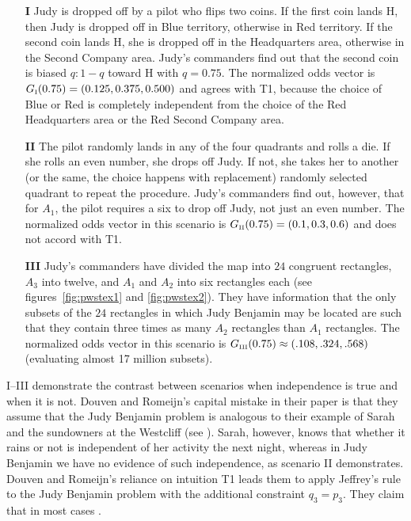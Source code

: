 \documentclass[12pt]{article}
\begin{document}
\begin{enumerate}
\item[\textbf{I}] Judy is dropped off by a pilot who flips two
  coins. If the first coin lands H, then Judy is dropped off in Blue
  territory, otherwise in Red territory. If the second coin lands H,
  she is dropped off in the Headquarters area, otherwise in the
  Second Company area. Judy's commanders find out that the second coin
  is biased $q:1-q$ toward H with $q=0.75$. The normalized odds
  vector is $G_{\mbox{\tiny I}}(0.75)=(0.125,0.375,0.500)$ and agrees
  with T1, because the choice of Blue or Red is completely independent
  from the choice of the Red Headquarters area or the Red Second
  Company area.
\item[\textbf{II}] The pilot randomly lands in any of the four
  quadrants and rolls a die. If she rolls an even number, she drops
  off Judy. If not, she takes her to another (or the same, the choice
  happens with replacement) randomly selected quadrant to repeat the
  procedure. Judy's commanders find out, however, that for $A_{1}$,
  the pilot requires a six to drop off Judy, not just an even number.
  The normalized odds vector in this scenario is $G_{\mbox{\tiny
      II}}(0.75)=(0.1,0.3,0.6)$ and does not accord with T1.
\item[\textbf{III}] Judy's commanders have divided the map into $24$
  congruent rectangles, $A_{3}$ into twelve, and $A_{1}$ and $A_{2}$
  into six rectangles each (see figures~\ref{fig:pwstex1} and
  \ref{fig:pwstex2}). They have information that the only subsets of
  the $24$ rectangles in which Judy Benjamin may be located are such
  that they contain three times as many $A_{2}$ rectangles than
  $A_{1}$ rectangles. The normalized odds vector in this scenario is
  $G_{\mbox{\tiny III}}(0.75)\approx(.108,.324,.568)$ (evaluating almost
  17 million subsets).
\end{enumerate}

I--III demonstrate the contrast between scenarios when independence is
true and when it is not. Douven and Romeijn's capital mistake in their
paper is that they assume that the Judy Benjamin problem is analogous
to their example of Sarah and the sundowners at the Westcliff (see
). Sarah, however, knows that whether it
rains or not is independent of her activity the next night, whereas in
Judy Benjamin we have no evidence of such independence, as scenario II
demonstrates. Douven and Romeijn's reliance on intuition T1 leads them
to apply Jeffrey's rule to the Judy Benjamin problem with the
additional constraint $q_{3}=p_{3}$. They claim that in most cases
.
\end{document}

